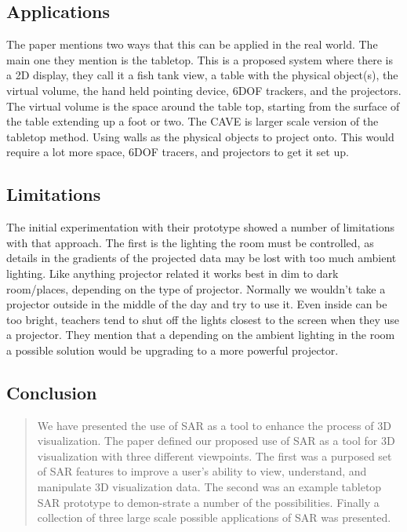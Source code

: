 \documentclass{sig-alternate}
\begin{document}
\subsection{Applications}
\label{sec:Applications}

The paper mentions two ways that this can be applied in the real world. The main one they mention is the tabletop. This is a proposed system where there is a 2D display, they call it a fish tank view, a table with the physical object(s), the virtual volume, the hand held pointing device, 6DOF trackers, and the projectors. The virtual volume is the space around the table top, starting from the surface of the table extending up a foot or two. The CAVE is larger scale version of the tabletop method. Using walls as the physical objects to project onto. This would require a lot more space, 6DOF tracers, and projectors to get it set up.


\subsection{Limitations}
\label{sec:Limitations}

The initial experimentation with their prototype showed a number of limitations with that approach. The first is the lighting the room must be controlled, as details in the gradients of the projected data may be lost with too much ambient lighting. Like anything projector related it works best in dim to dark room/places, depending on the type of projector. Normally we wouldn't take a projector outside in the middle of the day and try to use it. Even inside can be too bright, teachers tend to shut off the lights closest to the screen when they use a projector. They mention that a depending on the ambient lighting in the room a possible solution would be upgrading to a more powerful projector.  

\subsection{Conclusion}
\label{sec:Conclusion}

\begin{quote}
We have presented the use of SAR as a tool to enhance the process of 3D visualization. The paper defined our proposed use of SAR as a tool for 3D visualization with three different viewpoints. The first was a purposed set of SAR features to improve a user's ability to view, understand, and manipulate 3D visualization data. The second was an example tabletop SAR prototype to demon-strate a number of the possibilities. Finally a collection of three large scale possible applications of SAR was presented.
\end{quote}
\end{document}
